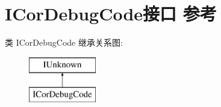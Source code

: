 \hypertarget{interface_i_cor_debug_code}{}\section{I\+Cor\+Debug\+Code接口 参考}
\label{interface_i_cor_debug_code}
类 I\+Cor\+Debug\+Code 继承关系图\+:\begin{figure}[H]
\begin{center}
\leavevmode
\includegraphics[height=2.000000cm]{interface_i_cor_debug_code}
\end{center}
\end{figure}
